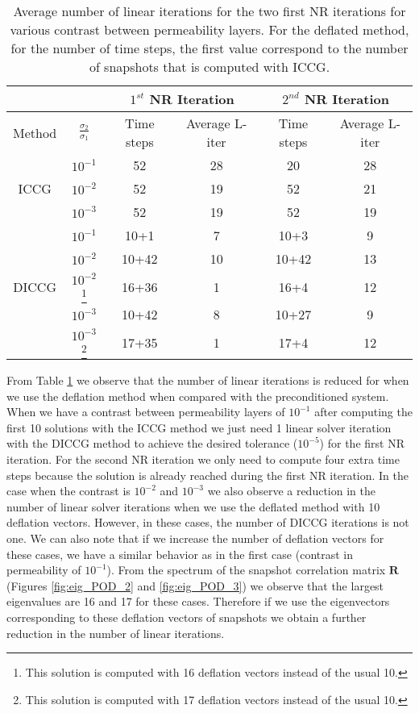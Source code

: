 \documentclass[12pt]{article}
\numberwithin{equation}{section}
\begin{document}
\begin{table}[!ht]\centering
\begin{minipage}{1\textwidth}
\vspace{-10pt}
\centering
\begin{tabular}{ |c|c|c|c|c|c|} 
  \hline
 & & \multicolumn{2}{|c|}{$1^{st}$ NR Iteration} & \multicolumn{2}{|c|}{$2^{nd}$ NR Iteration} \\
\hline
Method& $\frac{\sigma_2}{\sigma_1}$ & Time steps &Average L-iter &Time steps &Average L-iter\\
\hline
&$10^{-1}$ &52 & 28& 20&28 \\
ICCG&$10^{-2}$ & 52& 19& 52& 21\\
&$10^{-3}$ & 52 &19 & 52& 19\\
\hline
&$10^{-1}$ &10+1 &7 &10+3 & 9\\
&$10^{-2}$ &10+42 & 10& 10+42& 13\\
DICCG&$10^{-2}$\footnote{This solution is computed with 16 deflation vectors instead of the usual 10.} 
&16+36 & 1& 16+4& 12\\
&$10^{-3}$ & 10+42 & 8&10+27 & 9\\
&$10^{-3}$\footnote{This solution is computed with 17 deflation vectors instead of the usual 10.}  
& 17+35& 1& 17+4& 12\\
 \hline
 \end{tabular}
\caption{Average number of linear iterations for the two first NR iterations for various contrast between permeability layers. For the deflated method, for the number of time steps, the first value correspond to the number of snapshots that is computed with ICCG.}\label{table:liter}
\end{minipage}
\end{table}
From Table \ref{table:liter} we observe that the number of linear iterations is reduced for when we use the deflation method when compared with the preconditioned system. When we have a contrast between permeability layers of $10^{-1}$ after computing the first 10 solutions with the ICCG method we just need 1 linear solver iteration with the DICCG method to achieve the desired tolerance ($10^{-5}$) for the first NR iteration. For the second NR iteration we only need to compute four extra time steps because the solution is already reached during the first NR iteration. 
In the case when the contrast is $10^{-2}$ and $10^{-3}$ we also observe a reduction in the number of linear solver iterations when we use the deflated method with 10 deflation vectors. However, in these cases, the number of DICCG iterations is not one. We can also note that if we increase the number of deflation vectors for these cases, we have a similar behavior as in the first case (contrast in permeability of $10^{-1}$). From the spectrum of the snapshot correlation matrix $\mathbf{R}$ (Figures \ref{fig:eig_POD_2} and \ref{fig:eig_POD_3}) we observe that the largest eigenvalues are 16 and 17 for these cases. Therefore if we use the eigenvectors corresponding to these deflation vectors of snapshots we obtain a further reduction in the number of linear iterations. 
\end{document}
